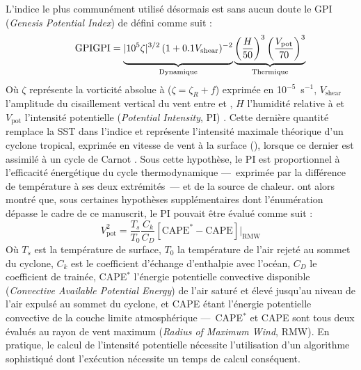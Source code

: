 \documentclass[../main.tex]{subfiles}
\begin{document}
L'indice le plus communément utilisé désormais est sans aucun doute le GPI (\textit{Genesis Potential Index}) de \textcite{emanuel_tropical_2004} défini comme suit :
%
\begin{equation*}
    \tag*{GPI}
    \mathrm{GPI} = \underbrace{\vphantom{\left( \frac{H}{50} \right)^3}\lvert 10^5 \zeta \rvert^{3/2} \, (1 + 0.1 V_{\mathrm{shear}})^{-2}}_{\mathrm{Dynamique}}
    \underbrace{\left( \frac{H}{50} \right)^3 \left( \frac{V_{\mathrm{pot}}}{70} \right)^3}_{\mathrm{Thermique}}
\end{equation*}
%
Où $\zeta$ représente la vorticité absolue à  ($\zeta = \zeta_R + f$) exprimée en 10$^{-5}$~s$^{-1}$, $V_{\mathrm{shear}}$ l'amplitude du cisaillement
vertical du vent entre  et , $H$ l'humidité relative à  et $V_{\mathrm{pot}}$ l'intensité potentielle (\textit{Potential Intensity},
PI) \parencite{emanuel_airsea_1986,emanuel_sensitivity_1995,bister_dissipative_1998,bister_low_2002}. Cette dernière quantité remplace la SST dans l'indice et
représente l'intensité maximale théorique d'un cyclone tropical, exprimée en vitesse de vent à la surface (\ms{}), lorsque ce dernier est assimilé à un cycle de
Carnot \parencite{emanuel_dependence_1987}. Sous cette hypothèse, le PI est proportionnel à l'efficacité énergétique du cycle thermodynamique ---~exprimée par la
différence de température à ses deux extrémités~--- et de la source de chaleur. \textcite{bister_low_2002} ont alors montré que, sous certaines hypothèses
supplémentaires dont l'énumération dépasse le cadre de ce manuscrit, le PI pouvait être évalué comme suit :
%
\begin{equation*}
    \tag*{PI}
    V_{\mathrm{pot}}^2 = \frac{T_s}{T_0} \frac{C_k}{C_D} \left[ \mathrm{CAPE}^* - \mathrm{CAPE} \right] \rvert_{\mathrm{RMW}}
\end{equation*}
%
Où $T_s$ est la température de surface, $T_0$ la température de l'air rejeté au sommet du cyclone, $C_k$ est le coefficient d'échange d'enthalpie avec l'océan,
$C_D$ le coefficient de trainée, CAPE$^*$ l'énergie potentielle convective disponible (\textit{Convective Available Potential Energy}) de l'air saturé et élevé
jusqu'au niveau de l'air expulsé au sommet du cyclone, et CAPE étant l'énergie potentielle convective de la couche limite atmosphérique ---~CAPE$^*$ et CAPE
sont tous deux évalués au rayon de vent maximum (\textit{Radius of Maximum Wind}, RMW). En pratique, le calcul de l'intensité potentielle nécessite
l'utilisation d'un algorithme sophistiqué dont l'exécution nécessite un temps de calcul conséquent.
\end{document}
